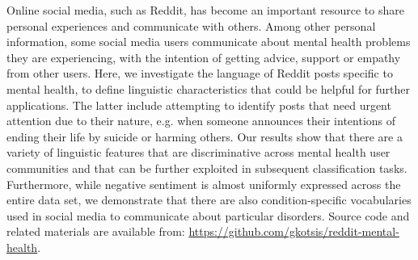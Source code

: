 Online social media, such as Reddit, has become an important resource to share personal experiences and communicate with others. Among other personal information, some social media users communicate about mental health problems they are experiencing, with the intention of getting advice, support or empathy from other users. Here, we investigate the language of Reddit posts specific to mental health, to define linguistic characteristics that could be helpful for further applications. The latter include attempting to identify posts that need urgent attention due to their nature, e.g. when someone announces their intentions of ending their life by suicide or harming others. Our results show that there are a variety of linguistic features that are discriminative across mental health user communities and that can be further exploited in subsequent classification tasks. Furthermore, while negative sentiment is almost uniformly expressed across the entire data set, we demonstrate that there are also condition-specific vocabularies used in social media to communicate about particular disorders. Source code and related materials are available from: \url{https://github.com/gkotsis/reddit-mental-health}.
